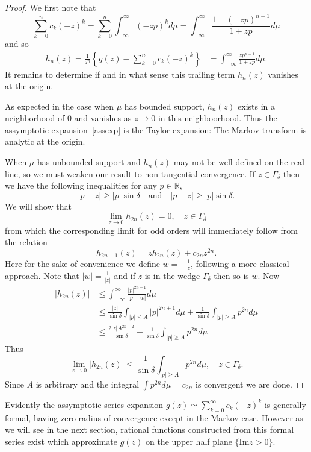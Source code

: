 \documentclass{amsart}
\theoremstyle{remark}
\numberwithin{equation}{section}
\newcommand{\RR}{\mathbb{R}}
\begin{document}
\begin{proof}
We first note that 
\[
    \sum_{k=0}^{n} c_k {(-z)}^k 
    = \sum_{k=0}^{n} \int_{-\infty}^\infty {(-zp)}^k d\mu
    = \int_{-\infty}^\infty \frac{1 - {(-zp)}^{n+1}}{1 + zp} d\mu
\]
and so
\begin{align*}
    h_n(z) = \frac1{z^n}\left\{g(z) - \sum_{k=0}^{n} c_k {(-z)}^k\right\}
    &= \int_{-\infty}^\infty \frac{zp^{n+1}}{1 + zp}d\mu.
\end{align*}
It remains to determine if and in what sense this trailing term $h_n(z)$ vanishes at the origin. 

As expected in the case when $\mu$ has bounded support, $h_n(z)$ exists in a neighborhood of $0$ and vanishes as $z \rightarrow 0$ in this neighboorhood. Thus the assymptotic expansion~\ref{assexp} is the Taylor expansion: The Markov transform is analytic at the origin.

When $\mu$ has unbounded support and $h_n(z)$ may not be well defined on the real line, so we must weaken our result to non-tangential convergence. If $z \in \Gamma_\delta$ then we have the following inequalities for any $p \in \RR$,
\[
    |p - z| \geq |p| \sin \delta 
    \quad\text{and} \quad
    |p - z| \geq |p| \sin \delta.
\]
We will show that
\[
    \lim_{z \rightarrow 0} h_{2n}(z) = 0, \quad z \in \Gamma_\delta
\]
from which the corresponding limit for odd orders will immediately follow from the relation
\[
    h_{2n-1}(z)
    = zh_{2n}(z) + c_{2n}z^{2n}.
\] 
Here for the sake of convenience we define $w = -\frac1z$, following a more classical approach. Note that $|w| = \frac1{|z|}$ and if $z$ is in the wedge $\Gamma_\delta$ then so is $w$. Now 
\begin{align*}
    |h_{2n}(z)| 
    &\leq \int_{-\infty}^\infty \frac{|p|^{2n+1}}{|p - w|}d\mu \\
    &\leq \frac{|z|}{\sin \delta} \int_{|p| \leq A} |p|^{2n+1} d\mu
    + \frac1{\sin \delta} \int_{|p| \geq A} p^{2n} d\mu \\
    &\leq \frac{2|z| A^{2n+2}}{\sin \delta}
    + \frac1{\sin \delta} \int_{|p| \geq A} p^{2n} d\mu
\end{align*}
Thus 
\[
    \lim_{z \rightarrow 0} |h_{2n}(z)| \leq \frac1{\sin \delta} \int_{|p| \geq A} p^{2n} d\mu, \quad z \in \Gamma_\delta.
\]
Since $A$ is arbitrary and the integral $\int p^{2n} d\mu = c_{2n}$ is convergent we are done.
\end{proof}

Evidently the assymptotic series expansion $g(z) \simeq \sum_{k=0}^\infty c_k {(-z)}^k$ is generally formal, having zero radius of convergence except in the Markov case. However as we will see in the next section, rational functions constructed from this formal series exist which approximate $g(z)$ on the upper half plane $\{\text{Im} z > 0\}$.
\end{document}

